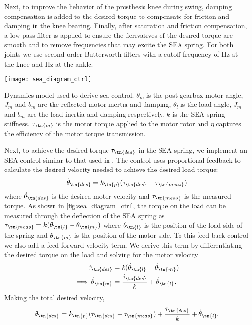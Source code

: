 Next, to improve the behavior of the prosthesis knee during swing, damping
compensation is added to the desired torque to compensate for friction and
damping in the knee bearing. Finally, after saturation and friction
compensation, a low pass filter is applied to ensure the derivatives of the
desired torque are smooth and to remove frequencies that may excite the SEA
spring. For both joints we use second order Butterworth filters with a cutoff
frequency of \unit[25]{Hz} at the knee and \unit[20]{Hz} at the ankle.

\begin{marginfigure}[-0.0in]
    \centering 
    \texttt{[image: sea\_diagram\_ctrl]}
    \caption[Dynamics model used to derive sea control]{Dynamics model used to
    derive sea control. $\theta_m$ is the post-gearbox motor angle, $J_m$ and
    $b_m$ are the reflected motor inertia and damping, $\theta_l$ is the load
    angle, $J_m$ and $b_m$ are the load inertia and damping respectively. $k$ is
    the SEA spring stiffness.  $\tau_\tn{m}$ is the motor torque applied to the
    motor rotor and $\eta$ captures the efficiency of the motor torque
    transmission.}\label{fig:sea_diagram_ctrl}
\end{marginfigure}
Next, to achieve the desired torque $\tau_\tn{des}$ in the SEA spring, we
implement an SEA control similar to that used in
\citet{schepelmann2012development}. The control uses proportional feedback to
calculate the desired velocity needed to achieve the desired load torque:
\begin{align}
    \dot \theta_\tn{des} = k_\tn{p} (\tau_\tn{des} - \tau_\tn{meas})
\end{align}
where $\dot \theta_\tn{des}$ is the desired motor velocity and $\tau_\tn{meas}$
is the measured torque. As shown in \cref{fig:sea_diagram_ctrl}, the torque on
the load can be measured through the deflection of the SEA spring as
$\tau_\tn{meas} = k (\theta_\tn{l} - \theta_\tn{m})$ where $\theta_\tn{l}$ is
the position of the load side of the spring and $\theta_\tn{m}$ is the position
of the motor side. To this feed-back control we also add a feed-forward velocity
term. We derive this term by differentiating the desired torque on the load and
solving for the motor velocity
\begin{align}
    \dot \tau_\tn{des} &= k (\dot \theta_\tn{l} - \dot \theta_\tn{m}) \\
    \implies \dot \theta_\tn{m} &= \frac{\dot \tau_\tn{des}}{k} 
        + \dot \theta_\tn{l}.\label{eq:motor_vel_from_tau_des}
\end{align}
Making the total desired velocity,
\begin{align}
    \dot \theta_\tn{des} = k_\tn{p} (\tau_\tn{des} - \tau_\tn{meas}) 
        + \frac{\dot \tau_\tn{des}}{k} + \dot \theta_\tn{l}.
\end{align}

